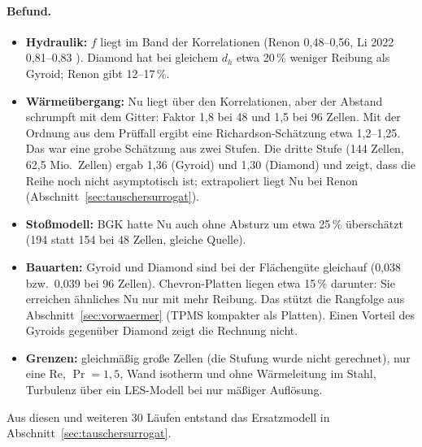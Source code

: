 \paragraph{Befund.}
\begin{itemize}
\item \textbf{Hydraulik:} $f$ liegt im Band der Korrelationen (Renon 0,48--0,56, Li 2022 0,81--0,83
  \cite{renon2024,alsafadi2026}). Diamond hat bei gleichem $d_h$ etwa 20\,\% weniger Reibung als Gyroid; Renon gibt
  12--17\,\%.
\item \textbf{Wärmeübergang:} Nu liegt über den Korrelationen, aber der Abstand schrumpft mit dem Gitter: Faktor 1,8
  bei 48 und 1,5 bei 96 Zellen. Mit der Ordnung aus dem Prüffall ergibt eine Richardson-Schätzung etwa 1,2--1,25. Das
  war eine grobe Schätzung aus zwei Stufen. Die dritte Stufe (144 Zellen, 62,5 Mio.\ Zellen) ergab 1,36 (Gyroid) und
  1,30 (Diamond) und zeigt, dass die Reihe noch nicht asymptotisch ist; extrapoliert liegt Nu bei Renon
  (Abschnitt~\ref{sec:tauschersurrogat}).
\item \textbf{Stoßmodell:} BGK hatte Nu auch ohne Absturz um etwa 25\,\% überschätzt (194 statt 154 bei 48 Zellen,
  gleiche Quelle).
\item \textbf{Bauarten:} Gyroid und Diamond sind bei der Flächengüte gleichauf (0,038 bzw.\ 0,039 bei 96 Zellen).
  Chevron-Platten liegen etwa 15\,\% darunter: Sie erreichen ähnliches Nu nur mit mehr Reibung. Das stützt die
  Rangfolge aus Abschnitt~\ref{sec:vorwaermer} (TPMS kompakter als Platten). Einen Vorteil des Gyroids gegenüber
  Diamond zeigt die Rechnung nicht.
\item \textbf{Grenzen:} gleichmäßig große Zellen (die Stufung wurde nicht gerechnet), nur eine Re, $\Pr = 1{,}5$,
  Wand isotherm und ohne Wärmeleitung im Stahl, Turbulenz über ein LES-Modell bei nur mäßiger Auflösung.
\end{itemize}



Aus diesen und weiteren 30 Läufen entstand das Ersatzmodell in Abschnitt~\ref{sec:tauschersurrogat}.
